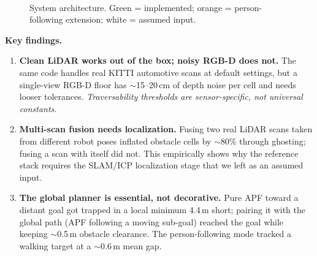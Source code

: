 \documentclass[11pt]{article}
\begin{document}
\begin{figure}[h]
\centering
{}
\\[-2pt]
{\scriptsize System architecture. Green = implemented; orange = person-following
extension; white = assumed input.}
\label{fig:arch}
\end{figure}

\vspace{-2pt}
\noindent\textbf{Key findings.}
\begin{enumerate}
  \item \textbf{Clean LiDAR works out of the box; noisy RGB-D does not.}
  The same code handles real KITTI \cite{geiger2013} automotive scans at default
  settings, but a single-view RGB-D floor has \mbox{$\sim$15--20\,cm} of depth
  noise per cell and needs looser tolerances. \emph{Traversability thresholds are
  sensor-specific, not universal constants.}
  \item \textbf{Multi-scan fusion needs localization.} Fusing two real LiDAR scans
  taken from different robot poses inflated obstacle cells by $\sim$80\% through
  ghosting; fusing a scan with itself did not. This empirically shows why the
  reference stack requires the SLAM/ICP \cite{besl1992} localization stage that we
  left as an assumed input.
  \item \textbf{The global planner is essential, not decorative.} Pure APF toward a
  distant goal got trapped in a local minimum 4.4\,m short; pairing it with the
  global path (APF following a moving sub-goal) reached the goal while keeping
  $\sim$0.5\,m obstacle clearance. The person-following mode tracked a walking
  target at a $\sim$0.6\,m mean gap.
\end{enumerate}
\end{document}
